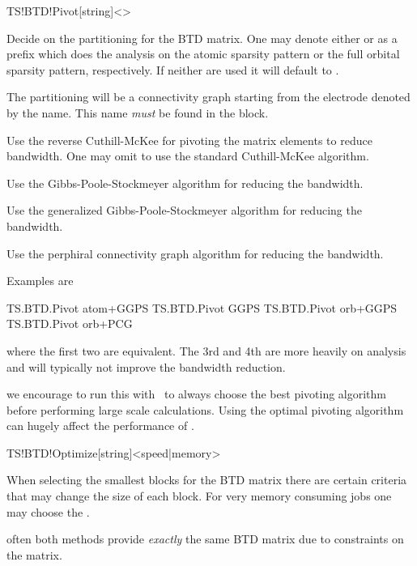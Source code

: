 \begin{fdfentry}{TS!BTD!Pivot}[string]<>

  Decide on the partitioning for the BTD matrix. One may denote either
   or  as a prefix which does the analysis on
  the atomic sparsity pattern or the full orbital sparsity pattern,
  respectively. If neither are used it will default to .

  \begin{fdfoptions}

    The partitioning will be a connectivity graph starting from the
    electrode denoted by the name. This name \emph{must} be found in
    the  block. 

    \option[rev-CM] %
    Use the reverse Cuthill-McKee for pivoting the matrix elements to
    reduce bandwidth. One may omit  to use the standard
    Cuthill-McKee algorithm.

    \option[GPS] %
    Use the Gibbs-Poole-Stockmeyer algorithm for reducing the
    bandwidth.

    \option[GGPS] %
    Use the generalized Gibbs-Poole-Stockmeyer algorithm for reducing
    the bandwidth.

    \option[PCG] %
    Use the perphiral connectivity graph algorithm for reducing the
    bandwidth.

  \end{fdfoptions}

  Examples are
  \begin{fdfexample}
    TS.BTD.Pivot atom+GGPS
    TS.BTD.Pivot GGPS
    TS.BTD.Pivot orb+GGPS
    TS.BTD.Pivot orb+PCG
  \end{fdfexample}
  where the first two are equivalent. The 3rd and 4th are more heavily
  on analysis and will typically not improve the bandwidth reduction.

  \note we encourage to run this with \fdftrue\ to always choose the
  best pivoting algorithm before performing large scale
  calculations. Using the optimal pivoting algorithm can hugely affect
  the performance of \tsiesta.
  
\end{fdfentry}

\begin{fdfentry}{TS!BTD!Optimize}[string]<speed|memory>

  When selecting the smallest blocks for the BTD matrix there are
  certain criteria that may change the size of each block. For very
  memory consuming jobs one may choose the . 

  \note often both methods provide \emph{exactly} the same BTD matrix
  due to constraints on the matrix.
  
\end{fdfentry}

